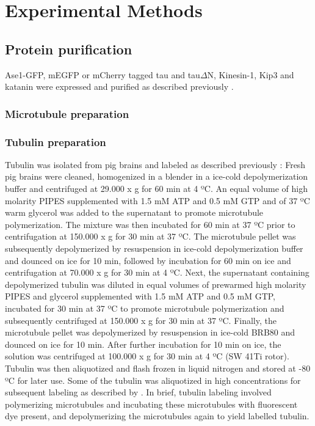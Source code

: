 \chapter{Experimental Methods}
\label{methods}
\section{Protein purification} 
Ase1-GFP, mEGFP or mCherry tagged tau and tau$\Delta$N, Kinesin-1, Kip3 and katanin were expressed and purified as described previously \parencite{HERNANDEZVEGA20172304,Herrmann2018,Mitra2018,NITZSCHE2010247, Janson2007}.

\subsection{Microtubule preparation}
\subsection{Tubulin preparation}
Tubulin was isolated from pig brains and labeled as described previously \parencite{CASTOLDI200383}: Fresh pig brains were cleaned, homogenized in a blender in a ice-cold depolymerization buffer and centrifuged at 29.000 x g for 60 min at 4 ºC. An equal volume of high molarity PIPES supplemented with 1.5 mM ATP and 0.5 mM GTP and of 37 ºC warm glycerol was added to the supernatant to promote microtubule polymerization. The mixture was then incubated for 60 min at 37 ºC prior to centrifugation at 150.000 x g for 30 min at 37 ºC. The microtubule pellet was subsequently depolymerized by resuspension in ice-cold depolymerization buffer and dounced on ice for 10 min, followed by incubation for 60 min on ice and centrifugation at 70.000 x g for 30 min at 4 ºC. Next, the supernatant containing depolymerized tubulin was diluted in equal volumes of prewarmed high molarity PIPES and glycerol supplemented with 1.5 mM ATP and 0.5 mM GTP, incubated for 30 min at 37 ºC to promote microtubule polymerization and subsequently centrifuged at 150.000 x g for 30 min at 37 ºC. Finally, the microtubule pellet was depolymerized by resuspension in ice-cold BRB80 and dounced on ice for 10 min. After further incubation for 10 min on ice, the solution was centrifuged at 100.000 x g for 30 min at 4 ºC (SW 41Ti rotor). Tubulin was then aliquotized and flash frozen in liquid nitrogen and stored at -80 ºC for later use. Some of the tubulin was aliquotized in high concentrations for subsequent labeling as described by \cite{HYMAN1991478}. In brief, tubulin labeling involved polymerizing microtubules and incubating these microtubules with fluorescent dye present, and depolymerizing the microtubules again to yield labelled tubulin.
